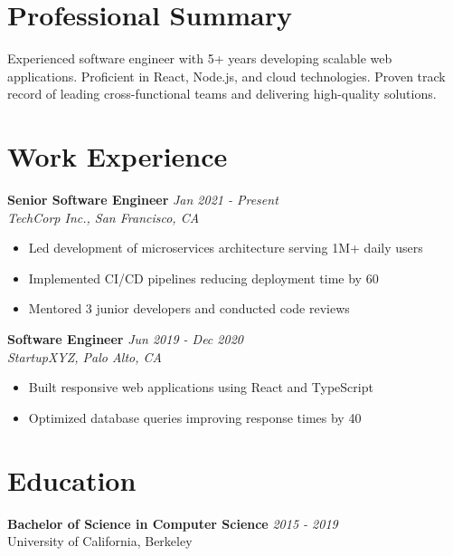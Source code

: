 \documentclass{article}
\begin{document}
\section*{Professional Summary}
Experienced software engineer with 5+ years developing scalable web applications. Proficient in React, Node.js, and cloud technologies. Proven track record of leading cross-functional teams and delivering high-quality solutions.

\vspace{0.2cm}

\section*{Work Experience}

\textbf{Senior Software Engineer} \hfill \textit{Jan 2021 - Present} \\
\textit{TechCorp Inc., San Francisco, CA}
\begin{itemize}[leftmargin=*]
    \item Led development of microservices architecture serving 1M+ daily users
    \item Implemented CI/CD pipelines reducing deployment time by 60%
    \item Mentored 3 junior developers and conducted code reviews
\end{itemize}

\textbf{Software Engineer} \hfill \textit{Jun 2019 - Dec 2020} \\
\textit{StartupXYZ, Palo Alto, CA}
\begin{itemize}[leftmargin=*]
    \item Built responsive web applications using React and TypeScript
    \item Optimized database queries improving response times by 40%
\end{itemize}

\vspace{0.2cm}

\section*{Education}
\textbf{Bachelor of Science in Computer Science} \hfill \textit{2015 - 2019} \\
University of California, Berkeley

\vspace{0.2cm}
\end{document}
